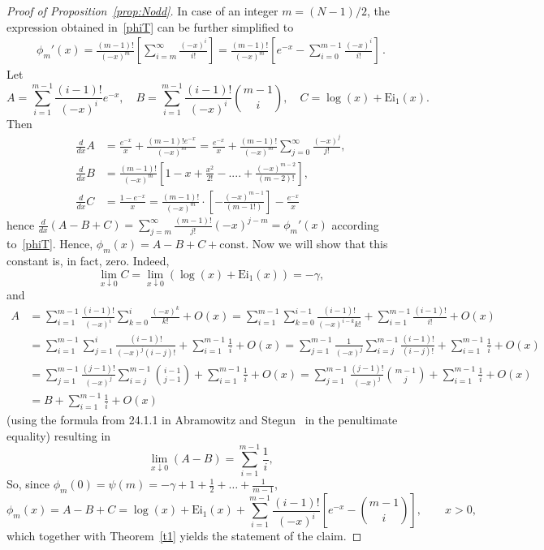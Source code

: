 \documentclass[12pt]{article}
\newcommand{\1}{\mathbf{1}}
\begin{document}
\begin{proof}[Proof of Proposition~\ref{prop:Nodd}]
In case of an integer $m=(N-1)/2$, the expression obtained in~\eqref{phiT}  can be further simplified to 
\begin{align*}
\phi_m'(x)=\frac{(m-1)!}{(-x)^m}\left[
\sum_{i=m}^{\infty}\frac{(-x)^i}{i!}
\right]=\frac{(m-1)!}{(-x)^m}\left[
e^{-x}-\sum_{i=0}^{m-1}\frac{(-x)^i}{i!}
\right]\,.
\end{align*}
Let
$$
A=\sum_{i=1}^{m-1} \frac{(i-1)!}{(-x)^i} e^{-x}, \quad
B=\sum_{i=1}^{m-1} \frac{(i-1)!}{(-x)^i}\binom{m-1}{i},
\quad C=\log (x)+\mathrm{Ei}_1(x).
$$
Then
\begin{align*}
\frac{d}{dx}A
&=\frac{e^{-x}}{x}+\frac{(m-1)!e^{-x}}{(-x)^m}
=\frac{e^{-x}}{x}+\frac{(m-1)!}{(-x)^m}\sum_{j=0}^\infty \frac{(-x)^j}{j!},
\\
\frac{d}{dx}B
&=\frac{(m-1)!}{(-x)^m}\left[1-x+\frac{x^2}{2!}-....+\frac{(-x)^{m-2}}{(m-2)!}\right],
\\
\frac{d}{dx}C&=\frac{1-e^{-x}}{x}
=\frac{(m-1)!}{(-x)^m}\cdot\left[-\frac{(-x)^{m-1}}{(m-1!)}\right] -\frac{e^{-x}}{x}
\end{align*}
hence $\displaystyle \frac{d}{dx}(A-B+C)=\sum_{j=m}^\infty \frac{(m-1)!}{j!} (-x)^{j-m}=\phi_m'(x)$ according to~\eqref{phiT}. Hence, $\phi_m(x)=A-B+C+\mathrm{const}$. Now we will show that this constant is, in fact, zero. Indeed,
$$
\lim_{x\downarrow 0} C=\lim_{x\downarrow 0} \left(\log(x)+\mathrm{Ei}_1(x)\right)=-\gamma,
$$
and
\begin{align*}
A&=\sum_{i=1}^{m-1} \frac{(i-1)!}{(-x)^i}
\sum_{k=0}^i \frac{(-x)^k}{k!}+O(x)
=\sum_{i=1}^{m-1}
\sum_{k=0}^{i-1} \frac{(i-1)!}{(-x)^{i-k}k!} 
+\sum_{i=1}^{m-1}\frac{(i-1)!}{i!}
+O(x)
\\ &
=\sum_{i=1}^{m-1}\sum_{j=1}^{i} \frac{(i-1)!}{(-x)^{j}(i-j)!} 
 +\sum_{i=1}^{m-1}\frac{1}{i}
+O(x)
=\sum_{j=1}^{m-1}\frac{1}{(-x)^{j}}\sum_{i=j}^{m-1} \frac{(i-1)!}{(i-j)!} 
 +\sum_{i=1}^{m-1}\frac{1}{i}
+O(x)
\\ &
=\sum_{j=1}^{m-1}\frac{(j-1)!}{(-x)^{j}}\sum_{i=j}^{m-1} \binom{i-1}{j-1}
 +\sum_{i=1}^{m-1}\frac{1}{i}
+O(x)
=\sum_{j=1}^{m-1}\frac{(j-1)!}{(-x)^{j}} \binom{m-1}{j}
 +\sum_{i=1}^{m-1}\frac{1}{i}
+O(x)
\\ &
=B+\sum_{i=1}^{m-1}\frac 1i +O(x)
\end{align*}
(using the formula from 24.1.1 in Abramowitz and Stegun~\cite{AS} in the penultimate equality)  resulting in
$$
\lim_{x\downarrow 0} (A-B)=\sum_{i=1}^{m-1}\frac 1i,
$$
So, since $\phi_m(0)=\psi(m)=-\gamma+1+\frac12+\dots+\frac1{m-1}$,
$$
\phi_m(x)=A-B+C=\log(x)+\mathrm{Ei}_1(x)+\sum_{i=1}^{m-1} \frac{(i-1)!}{(-x)^i}
\left[e^{-x}-\binom{m-1}{i}\right],\qquad  x>0,
$$
which together with Theorem~\ref{t1} yields the statement of the claim.
\end{proof}
\end{document}
